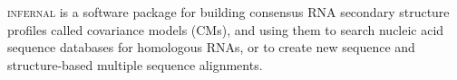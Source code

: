 \textsc{infernal} is a software package for building
consensus RNA secondary structure profiles called covariance models
(CMs), and using them to search nucleic acid sequence databases for
homologous RNAs, or to create new sequence and structure-based
multiple sequence alignments.
